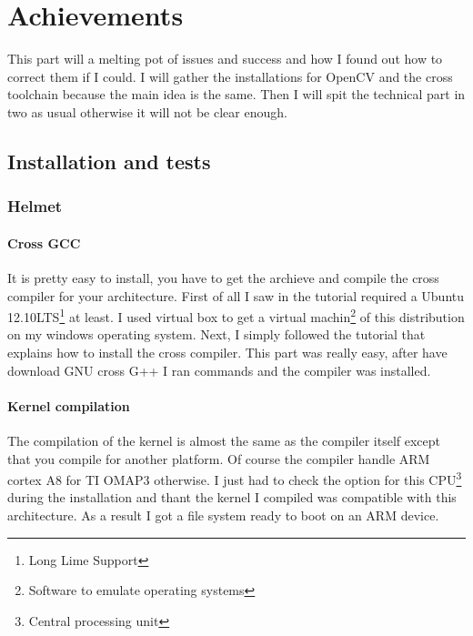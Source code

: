 \chapter{Achievements}
\par This part will a melting pot of issues and success and how I found out how to correct them if I could. I will gather the installations for OpenCV and the cross toolchain because the main idea is the same. Then I will spit the technical part in two as usual otherwise it will not be clear enough.	
	
	\section{Installation and tests}
	
	\subsection{Helmet}
	\subsubsection{Cross GCC}
	
	\par It is pretty easy to install, you have to get the archieve and compile the cross compiler for your architecture. First of all I saw in the tutorial required a Ubuntu 12.10LTS\footnote{Long Lime Support} at least. I used virtual box to get a virtual machin\footnote{Software to emulate operating systems} of this distribution on my windows operating system. Next, I simply followed the tutorial that explains how to install the cross compiler. This part was really easy, after have download GNU cross G++ I ran commands and the compiler was installed.
	
	\subsubsection{Kernel compilation}
	
	\par The compilation of the kernel is almost the same as the compiler itself except that you compile for another platform. Of course the compiler handle ARM cortex A8 for TI OMAP3 otherwise. I just had to check the option for this CPU\footnote{Central processing unit} during the installation and thant the kernel I compiled was compatible with this architecture. As a result I got a file system ready to boot on an ARM device.
	
